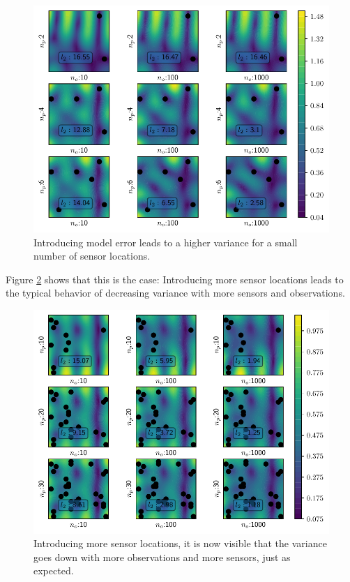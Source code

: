\documentclass[%
  a4paper,oneside,%
  11pt,%
  smallchapters,
  style=printdev,
  extramargin,
  green,%
  rgb, <cmyk>
  ]{tubsbook}
\begin{document}
\begin{figure}[!ht]
\includegraphics[width=.9\textwidth]{../../Python/Results/2D/100procent_d/VarField_Posterior.pdf}
\centering
\caption{Introducing model error leads to a higher variance for a small number of sensor locations.}
\label{fig:100procent_d}
\end{figure}
Figure \ref{fig:100procent_d_more} shows that this is the case: Introducing more sensor locations leads to the typical behavior of decreasing variance with more sensors and observations.
\begin{figure}[!ht]
\includegraphics[width=.9\textwidth]{../../Python/Results/2D/100procent_d/VarField_PosteriorMoreSensors.pdf}
\centering
\caption{Introducing more sensor locations, it is now visible that the variance goes down with more observations and more sensors, just as expected.}
\label{fig:100procent_d_more}
\end{figure}
\end{document}

